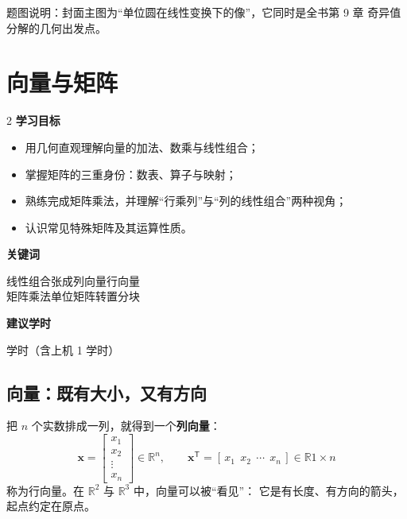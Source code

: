 \documentclass[11pt,a4paper,openany]{ctexbook}
\newcommand{\R}{\mathbb{R}}
\newcommand{\Rnum}[1]{\mathbb{R}^{#1}}
\renewcommand{\cleardoublepage}{\clearpage}
\begin{document}
\vfill
\noindent\sffamily\footnotesize\color{inkl}
题图说明：封面主图为“单位圆在线性变换下的像”，它同时是全书第 9 章
奇异值分解的几何出发点。


\cleardoublepage
{\sffamily\hypersetup{linkcolor=ink}\tableofcontents}

\mainmatter
{}
\chapter{向量与矩阵}
\label{ch:vecmat}

\begin{chapoutline}
\small
\begin{multicols}{2}
\textbf{学习目标}
\begin{itemize}[leftmargin=1.5em, itemsep=1.5pt]
\item 用几何直观理解向量的加法、数乘与线性组合；
\item 掌握矩阵的三重身份：数表、算子与映射；
\item 熟练完成矩阵乘法，并理解“行乘列”与“列的线性组合”两种视角；
\item 认识常见特殊矩阵及其运算性质。
\end{itemize}
\columnbreak
\textbf{关键词}
\par\smallskip
线性组合\quad 张成\quad 列向量\quad 行向量\\
矩阵乘法\quad 单位矩阵\quad 转置\quad 分块
\par\smallskip
\textbf{建议学时}
\par{} 学时（含上机 1 学时）
\end{multicols}
\end{chapoutline}

\section{向量：既有大小，又有方向}

把 $n$ 个实数排成一列，就得到一个\textbf{列向量}：
\[
\boldsymbol{x}=\begin{bmatrix}x_1\\ x_2\\ \vdots\\ x_n\end{bmatrix}\in\Rnum{n},
\qquad
\boldsymbol{x}^{\mathsf T}=[\,x_1\ \ x_2\ \ \cdots\ \ x_n\,]\in\R{1\times n}
\]
称为行向量。在 $\Rnum{2}$ 与 $\Rnum{3}$ 中，向量可以被“看见”：
它是有长度、有方向的箭头，起点约定在原点。
\end{document}
